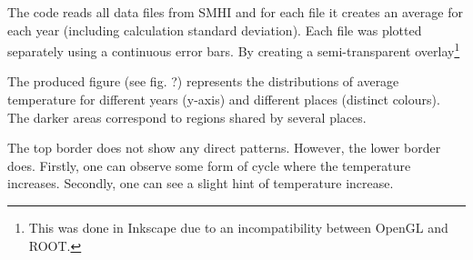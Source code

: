 The code reads all data files from SMHI and for each file it creates an average for each year (including calculation standard deviation). Each file was plotted separately using a continuous error bars. By creating a semi-transparent overlay\footnote{This was done in Inkscape due to an incompatibility between OpenGL and ROOT.}

The produced figure (see fig. ?) represents the distributions of average temperature for different years (y-axis) and different places (distinct colours). The darker areas correspond to regions shared by several places.

The top border does not show any direct patterns. However, the lower border does. Firstly, one can observe some form of cycle where the temperature increases.
Secondly, one can see a slight hint of temperature increase.
